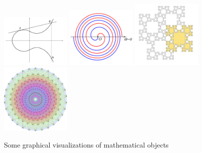 \documentclass{deliverablereport}
\begin{document}
\begin{figure}
\begin{center}
    \hfil
    \includegraphics[width=0.3\textwidth]{images/elliptic-curve}
    \hfil
    \includegraphics[width=0.3\textwidth]{images/548px-Fermat's_spiral_01}
    \includegraphics[width=0.3\textwidth]{images/619px-Tiling_Fibonacci_word_fractal}
    \hfil
    \includegraphics[width=0.3\textwidth]{images/597px-E8Petrie}
  \end{center}
  \caption{Some graphical visualizations of mathematical objects}
  \label{fig:math_viz}
\end{figure}

\end{document}
